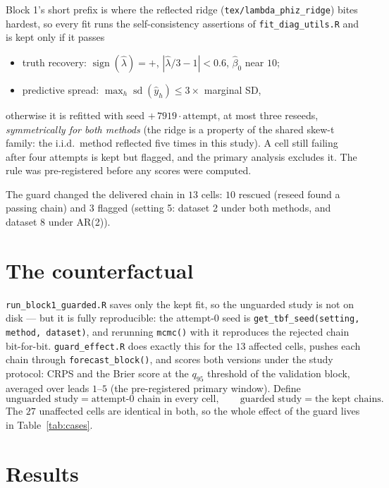 \documentclass[11pt]{article}
\newcommand{\code}[1]{\texttt{#1}}
\DeclareMathOperator{\sd}{sd}
\begin{document}
Block 1's short prefix is where the reflected ridge
(\code{tex/lambda\_phiz\_ridge}) bites hardest, so every fit runs the
self-consistency assertions of \code{fit\_diag\_utils.R} and is kept only if
it passes
\begin{itemize}\itemsep1pt
  \item[\textbf{B}] truth recovery: $\operatorname{sign}(\hat\lambda) = +$,
        $|\hat\lambda/3 - 1| < 0.6$, $\hat\beta_0$ near $10$;
  \item[\textbf{C}] predictive spread: $\max_h \sd(\hat y_h) \le 3 \times$
        marginal SD,
\end{itemize}
otherwise it is refitted with seed $+\,7919 \cdot \text{attempt}$, at most
three reseeds, \emph{symmetrically for both methods} (the ridge is a property
of the shared skew-t family: the i.i.d.\ method reflected five times in this
study). A cell still failing after four attempts is kept but flagged, and the
primary analysis excludes it. The rule was pre-registered before any scores
were computed.

The guard changed the delivered chain in $13$ cells: $10$ rescued
(reseed found a passing chain) and $3$ flagged (setting 5: dataset 2 under
both methods, and dataset 8 under AR(2)).

\section{The counterfactual}

\code{run\_block1\_guarded.R} saves only the kept fit, so the unguarded
study is not on disk --- but it is fully reproducible: the attempt-0 seed is
\code{get\_tbf\_seed(setting, method, dataset)}, and rerunning \code{mcmc()}
with it reproduces the rejected chain bit-for-bit. \code{guard\_effect.R}
does exactly this for the $13$ affected cells, pushes each chain through
\code{forecast\_block()}, and scores both versions under the study protocol:
CRPS and the Brier score at the $q_{95}$ threshold of the validation block,
averaged over leads $1$--$5$ (the pre-registered primary window).
Define
\begin{equation*}
  \text{unguarded study} = \text{attempt-0 chain in every cell},
  \qquad
  \text{guarded study} = \text{the kept chains}.
\end{equation*}
The $27$ unaffected cells are identical in both, so the whole effect of the
guard lives in Table~\ref{tab:cases}.

\section{Results}
\end{document}

